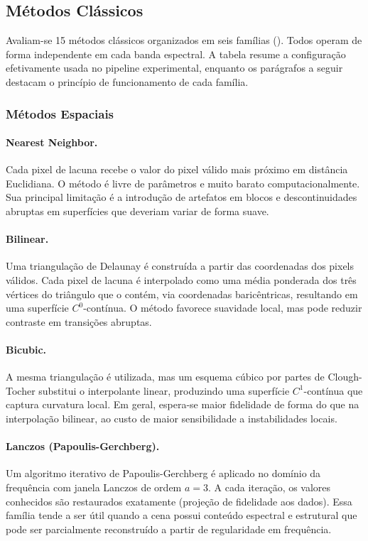 \subsection{Métodos Clássicos}
\label{sec:interpolation-methods}

Avaliam-se 15 métodos clássicos organizados em seis famílias ().
Todos operam de forma independente em cada banda espectral.
A tabela resume a configuração efetivamente usada no pipeline experimental, enquanto os parágrafos a seguir destacam o princípio de funcionamento de cada família.



\subsubsection{Métodos Espaciais}

\paragraph{Nearest Neighbor.}
Cada pixel de lacuna recebe o valor do pixel válido mais próximo em distância Euclidiana.
O método é livre de parâmetros e muito barato computacionalmente.
Sua principal limitação é a introdução de artefatos em blocos e descontinuidades abruptas em superfícies que deveriam variar de forma suave.

\paragraph{Bilinear.}
Uma triangulação de Delaunay é construída a partir das coordenadas dos pixels válidos.
Cada pixel de lacuna é interpolado como uma média ponderada dos três vértices do triângulo que o contém, via coordenadas baricêntricas, resultando em uma superfície $C^0$-contínua.
O método favorece suavidade local, mas pode reduzir contraste em transições abruptas.

\paragraph{Bicubic.}
A mesma triangulação é utilizada, mas um esquema cúbico por partes de Clough-Tocher substitui o interpolante linear, produzindo uma superfície $C^1$-contínua que captura curvatura local.
Em geral, espera-se maior fidelidade de forma do que na interpolação bilinear, ao custo de maior sensibilidade a instabilidades locais.

\paragraph{Lanczos (Papoulis-Gerchberg).}
Um algoritmo iterativo de Papoulis-Gerchberg é aplicado no domínio da frequência com janela Lanczos de ordem $a{=}3$.
A cada iteração, os valores conhecidos são restaurados exatamente (projeção de fidelidade aos dados).
Essa família tende a ser útil quando a cena possui conteúdo espectral e estrutural que pode ser parcialmente reconstruído a partir de regularidade em frequência.

